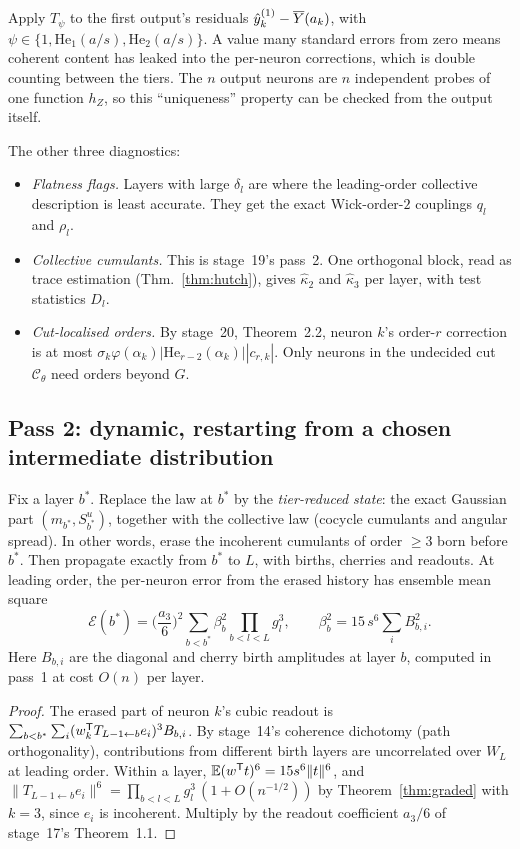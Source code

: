 Apply $T_\psi$ to the first output's residuals $\hat y^{(1)}_k-\overline{Y}(a_k)$, with $\psi\in\{1,\mathrm{He}_1(a/s),\mathrm{He}_2(a/s)\}$. A value
many standard errors from zero means coherent content has leaked into the per-neuron corrections, which is
double counting between the tiers. The $n$ output neurons are $n$ independent probes of one function $h_Z$,
so this ``uniqueness'' property can be checked from the output itself.

The other three diagnostics:
\begin{itemize}[leftmargin=1.2em,itemsep=1pt,topsep=1pt]
\item[(D2)] \emph{Flatness flags.} Layers with large $\delta_l$ are where the leading-order collective description
is least accurate. They get the exact Wick-order-$2$ couplings $q_l$ and $\rho_l$.
\item[(D3)] \emph{Collective cumulants.} This is stage~19's pass~2. One orthogonal block, read as trace
estimation (Thm.~\ref{thm:hutch}), gives $\hat\kappa_2$ and $\hat\kappa_3$ per layer, with test statistics $D_l$.
\item[(D4)] \emph{Cut-localised orders.} By stage~20, Theorem~2.2, neuron $k$'s order-$r$ correction is at most
$\sigma_k\varphi(\alpha_k)|\mathrm{He}_{r-2}(\alpha_k)||c_{r,k}|$. Only neurons in the undecided cut $\mathcal C_\theta$ need orders beyond $G$.
\end{itemize}

\subsection{Pass 2: dynamic, restarting from a chosen intermediate distribution}
\begin{theorem}\label{thm:restart}
Fix a layer $b^*$. Replace the law at $b^*$ by the \emph{tier-reduced state}: the exact Gaussian part
$(m_{b^*},S^u_{b^*})$, together with the collective law (cocycle cumulants and angular spread). In other
words, erase the incoherent cumulants of order $\ge3$ born before $b^*$. Then propagate exactly from $b^*$ to
$L$, with births, cherries and readouts. At leading order, the per-neuron error from the erased history has
ensemble mean square
\[
\mathcal E(b^*)=\Big(\frac{a_3}{6}\Big)^2\sum_{b<b^*}\beta_b^2\prod_{b<l<L}g_l^3,\qquad \beta_b^2=15\,s^6\sum_iB_{b,i}^2 .
\]
Here $B_{b,i}$ are the diagonal and cherry birth amplitudes at layer $b$, computed in pass~1 at cost $O(n)$ per
layer.
\end{theorem}
\begin{proof}
The erased part of neuron $k$'s cubic readout is $\sum_{b<b^*}\sum_i(w_k^{\mathsf T} T_{L-1\leftarrow b}e_i)^3B_{b,i}$. By stage~14's
coherence dichotomy (path orthogonality), contributions from different birth layers are uncorrelated over
$W_L$ at leading order. Within a layer, $\mathbb{E}(w^{\mathsf T} t)^6=15s^6\|t\|^6$, and
$\|T_{L-1\leftarrow b}e_i\|^6=\prod_{b<l<L}g_l^3\,(1+O(n^{-1/2}))$ by Theorem~\ref{thm:graded} with $k=3$, since $e_i$ is incoherent.
Multiply by the readout coefficient $a_3/6$ of stage~17's Theorem~1.1.
\end{proof}

